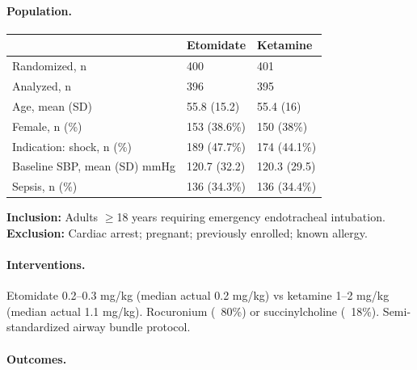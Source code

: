 \documentclass[11pt]{article}
\begin{document}
\paragraph{Population.}

\begin{table}[H]
\centering\footnotesize
\begin{tabularx}{\textwidth}{L{4cm} C{3cm} C{3cm}}
\toprule
& \textbf{Etomidate} & \textbf{Ketamine} \\
\midrule
Randomized, n & 400 & 401 \\
Analyzed, n & 396 & 395 \\
Age, mean (SD) & 55.8 (15.2) & 55.4 (16) \\
Female, n (\%) & 153 (38.6\%) & 150 (38\%) \\
Indication: shock, n (\%) & 189 (47.7\%) & 174 (44.1\%) \\
Baseline SBP, mean (SD) mmHg & 120.7 (32.2) & 120.3 (29.5) \\
Sepsis, n (\%) & 136 (34.3\%) & 136 (34.4\%) \\
\bottomrule
\end{tabularx}
\end{table}

\noindent\textbf{Inclusion:} Adults $\geq$18 years requiring emergency endotracheal intubation.\\
\textbf{Exclusion:} Cardiac arrest; pregnant; previously enrolled; known allergy.

\paragraph{Interventions.}
Etomidate 0.2--0.3 mg/kg (median actual 0.2 mg/kg) vs ketamine 1--2 mg/kg (median actual 1.1 mg/kg). Rocuronium (~80\%) or succinylcholine (~18\%). Semi-standardized airway bundle protocol.

\paragraph{Outcomes.}
\end{document}
